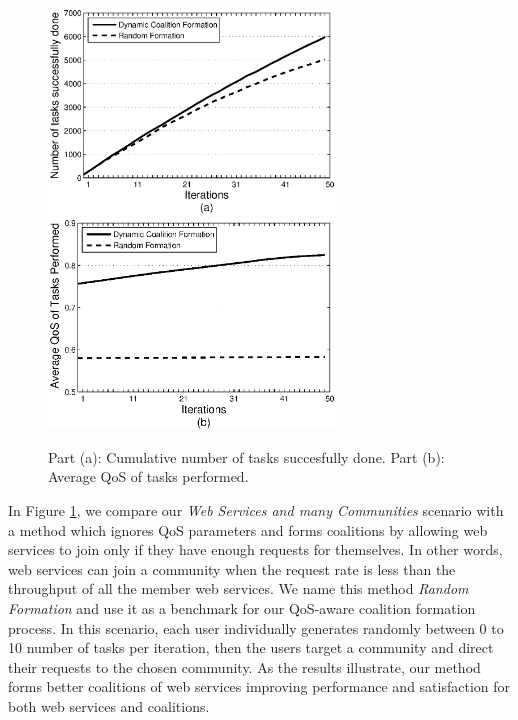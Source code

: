 \begin{figure}[!t]
\centering
\includegraphics[width=3in]{Figures/s2_task_done.eps}
\includegraphics[width=3in]{Figures/s2_task_qos.eps}
\caption{Part (a): Cumulative number of tasks succesfully done. Part
(b): Average QoS of tasks performed.} \label{performancemany}
\end{figure}

In Figure \ref{performancemany}, we compare our \emph{Web Services
and many Communities} scenario with a method which ignores QoS
parameters and forms coalitions by allowing web services to join
only if they have enough requests for themselves. In other words,
web services can join a community when the request rate is less
than the throughput of all the member web services. We name this
method \emph{Random Formation} and use it as a benchmark for our
QoS-aware coalition formation process. In this scenario, each user individually generates randomly
between 0 to 10 number of tasks per iteration, then the users target a community and direct their requests to the chosen community. As the results illustrate,
our method forms better coalitions of web services improving
performance and satisfaction for both web services and coalitions.


